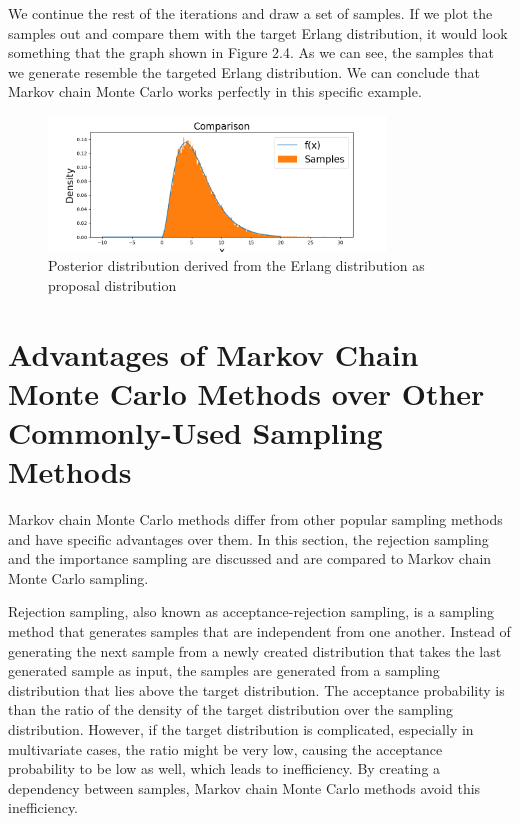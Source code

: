 We continue the rest of the iterations and draw a set of samples. If we plot the samples out and compare them with the target Erlang distribution, it would look something that the graph shown in Figure 2.4. As we can see, the samples that we generate resemble the targeted Erlang distribution. We can conclude that Markov chain Monte Carlo works perfectly in this specific example.

\begin{figure}[H]
    \centering
    \includegraphics[width=0.8\textwidth]{figures/mcmc_example/result.png}
    \captionsetup{width=.8\textwidth}
    \caption{Posterior distribution derived from the Erlang distribution as proposal distribution}
    \label{fig:enter-label}
\end{figure}

\section{Advantages of Markov Chain Monte Carlo Methods over Other Commonly-Used Sampling Methods}
Markov chain Monte Carlo methods differ from other popular sampling methods and have specific advantages over them. In this section, the rejection sampling and the importance sampling are discussed and are compared to Markov chain Monte Carlo sampling.

Rejection sampling, also known as acceptance-rejection sampling, is a sampling method that generates samples that are independent from one another. Instead of generating the next sample from a newly created distribution that takes the last generated sample as input, the samples are generated from a sampling distribution that lies above the target distribution. The acceptance probability is than the ratio of the density of the target distribution over the sampling distribution.\cite{mcmc_practice} However, if the target distribution is complicated, especially in multivariate cases, the ratio might be very low, causing the acceptance probability to be low as well, which leads to inefficiency. By creating a dependency between samples, Markov chain Monte Carlo methods avoid this inefficiency.\cite{ComparisonSampling}

